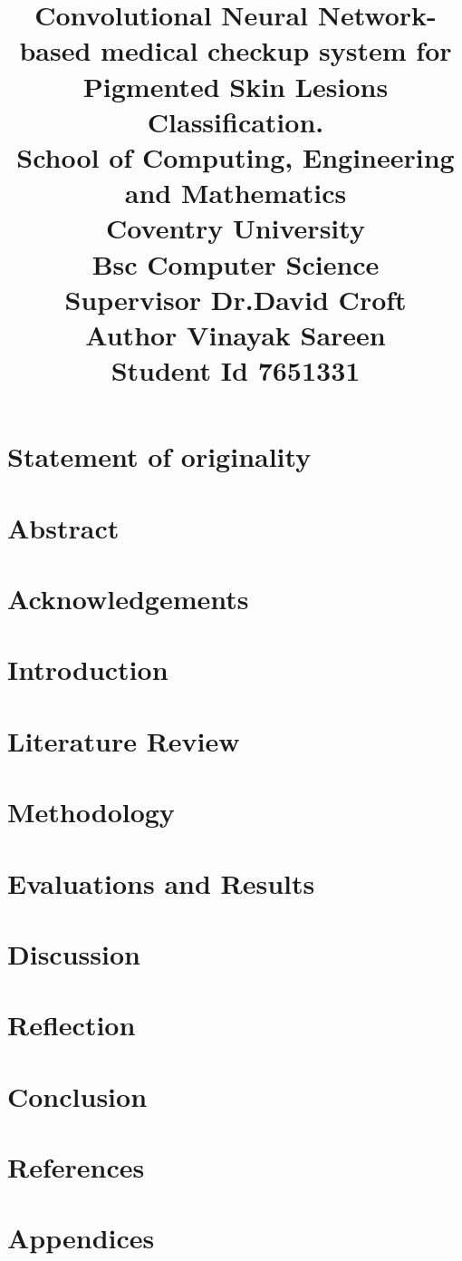 \documentclass[12pt]{report}
\title{
	{Convolutional Neural Network-based medical checkup system for Pigmented Skin Lesions Classification.} \\
	\vspace{5mm} %
	{\large School of Computing, Engineering and Mathematics} \\
	{\large Coventry University} \\
	\vspace{3mm} %
	{\large Bsc Computer Science}\\
	{\large Supervisor Dr.David Croft}\\
	{\large Author Vinayak Sareen}\\
	{\large Student Id 7651331}
}
\date{}
\begin{document}
\maketitle

\chapter*{Statement of originality}
\tableofcontents

\chapter*{Abstract}


\chapter*{Acknowledgements}


\chapter{Introduction}



\chapter{Literature Review}


\chapter{Methodology}


\chapter{Evaluations and Results}


\chapter{Discussion}


\chapter{Reflection}


\chapter{Conclusion}


\chapter*{References}


\chapter*{Appendices}

\end{document}
